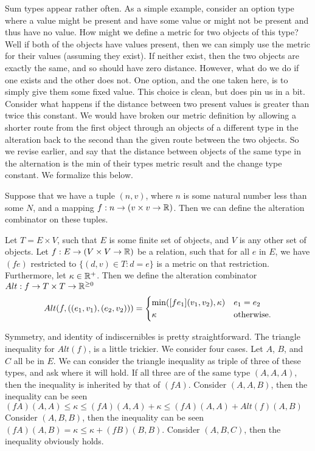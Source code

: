 Sum types appear rather often.
As a simple example, consider an option type where a value might be present and have some value 
or might not be present and thus have no value.
How might we define a metric for two objects of this type?
Well if both of the objects have values present, then we can simply use the metric for their values (assuming they exist).
If neither exist, then the two objects are exactly the same, and so should have zero distance.
However, what do we do if one exists and the other does not.
One option, and the one taken here, is to simply give them some fixed value.
This choice is clean, but does pin us in a bit.
Consider what happens if the distance between two present values is greater than twice this constant.
We would have broken our metric definition by allowing a shorter route from the first object through an objects of a different type in the alteration
back to the second than the given route between the two objects.
So we revise earlier, and say that the distance between objects of the same type in the alternation is the min of their types metric result 
and the change type constant. 
We formalize this below.

Suppose that we have a tuple $(n, v)$, where $n$ is some natural number less than some $N$,
and a mapping $f : n \to (v \times v \to \mathbb{R})$.
Then we can define the alteration combinator on these tuples.

\begin{definition}
Let $T = E \times V$, such that $E$ is some finite set of objects, and $V$ is any other set of objects.
Let $f : E \to (V \times V \to \mathbb{R})$ be a relation, such that for all $e$ in $E$, 
we have $(f e)$ restricted to $\{ (d, v) \in T : d = e \}$ is a metric on that restriction.
Furthermore, let $\kappa \in \mathbb{R}^{+}$.
Then we define the alteration combinator $Alt : f \to T \times T \to \mathbb{R}^{\ge 0}$
$$ Alt(f, ((e_1, v_1), (e_2, v_2))) = \begin{cases}
    \min( [f e_1](v_1, v_2), \kappa) & e_1 = e_2 \\ 
    \kappa & \text{otherwise.}
\end{cases}$$
\end{definition}

Symmetry, and identity of indiscernibles is pretty straightforward.
The triangle inequality for $Alt(f)$, is a little trickier.
We consider four cases. 
Let $A$, $B$, and $C$ all be in $E$.
We can consider the triangle inequality as triple of three of these types,
and ask where it will hold. 
If all three are of the same type $(A, A, A)$, then the inequality is inherited by that of $(f A)$.
Consider $(A, A, B)$, then the inequality can be seen $(f A)(A, A) \le \kappa \le (f A)(A, A) + \kappa \le (f A)(A, A) + Alt(f)(A, B)$
Consider $(A, B, B)$, then the inequality can be seen $(f A)(A, B) = \kappa \le \kappa + (f B)(B, B)$.
Consider $(A, B, C)$, then the inequality obviously holds.
